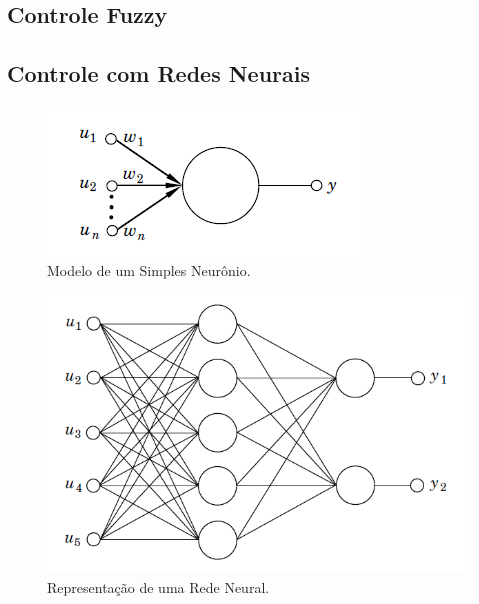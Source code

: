 
\subsection{Controle Fuzzy} %



\subsection{Controle com Redes Neurais}  %

\begin{figure}[!ht]
  \caption{Modelo de um Simples Neurônio.}
  \begin{center}
      \includegraphics[scale=0.6]{img/neuron_astrom_p295}
  \end{center}
  \label{fig:neuron_astrom_p295}
\end{figure}

\begin{figure}[!ht]
  \caption{Representação de uma Rede Neural.}
  \begin{center}
      \includegraphics[scale=0.65]{img/feedforward_neural_astrom_p297}
  \end{center}
  \label{fig:feedforward_neural_astrom_p297}
\end{figure}

